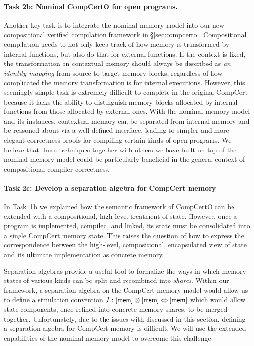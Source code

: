 \paragraph*{Task 2b: Nominal CompCertO for open programs.}
Another key task is to integrate the nominal memory model into our
new compositional verified compilation framework in
\S\ref{sec:compcerto}.  Compositional compilation needs to not only
keep track of how memory is transformed by internal functions, but
also do that for external functions.  If the context is fixed, the
transformation on contextual memory should always be described as
\emph{an identity mapping} from source to target memory blocks,
regardless of how complicated the memory transformation is for
internal executions.  However, this seemingly simple task is extremely
difficult to complete in the original CompCert because it lacks the
ability to distinguish memory blocks allocated by internal functions
from those allocated by external ones. With the nominal memory model and its
instances, contextual memory can be separated from internal memory and
be reasoned about via a well-defined interface, leading to simpler and
more elegant correctness proofs for compiling certain kinds of open
programs. We believe that these techniques together with others we
have built on top of the nominal memory model could be particularly
beneficial in the general context of compositional compiler
correctness.

\vspace*{-2ex}
\paragraph*{Task 2c: Develop a separation algebra for CompCert memory}
In Task~1b we explained how the semantic framework of CompCertO
can be extended with a compositional, high-level treatment of state.
However, once a program is implemented, compiled, and linked,
its state must be consolidated into
a single CompCert memory state.
This raises the question of how to express
the correspondence between
the high-level, compositional, encapsulated view of state
and its ultimate implementation as concrete memory.

Separation algebras \cite{sepalg}
provide a useful tool to formalize the ways in which
memory states of various kinds can be
split and recombined into \emph{shares}.
Within our framework,
a separation algebra on the CompCert memory model
would allow us to define
a simulation convention
$J : [ \mathsf{mem} ] \otimes [ \mathsf{mem} ] \Leftrightarrow [ \mathsf{mem} ]$
which would allow state components,
once refined into concrete memory shares,
to be merged together.
%
Unfortunately,
due to the issues with \nextblock
discussed in this section,
defining a separation algebra for CompCert memory
is difficult.
We will use the extended capabilities of
the nominal memory model
to overcome this challenge.

